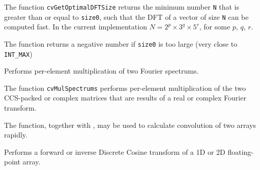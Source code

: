 \begin{description}
\end{description}


The function \texttt{cvGetOptimalDFTSize} returns the minimum number
\texttt{N} that is greater than or equal to \texttt{size0}, such that the DFT
of a vector of size \texttt{N} can be computed fast. In the current
implementation $N=2^p \times 3^q \times 5^r$, for some $p$, $q$, $r$.

The function returns a negative number if \texttt{size0} is too large
(very close to \texttt{INT\_MAX})


\label{MulSpectrums}

Performs per-element multiplication of two Fourier spectrums.


\begin{description}

\end{description}

The function \texttt{cvMulSpectrums} performs per-element multiplication of the two CCS-packed or complex matrices that are results of a real or complex Fourier transform.

The function, together with , may be used to calculate convolution of two arrays rapidly.


\label{DCT}

Performs a forward or inverse Discrete Cosine transform of a 1D or 2D floating-point array.



